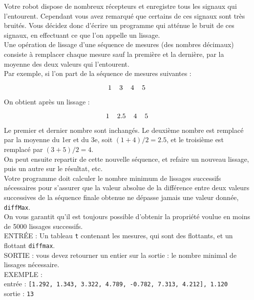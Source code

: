 Votre robot dispose de nombreux récepteurs et enregistre tous les signaux qui l'entourent. Cependant 
vous avez remarqué que certains de ces signaux sont très bruités. Vous décidez donc d'écrire un 
programme qui atténue le bruit de ces signaux, en effectuant ce que l'on appelle un lissage.\\
Une opération de lissage d'une séquence de mesures (des nombres décimaux) consiste à remplacer 
chaque mesure sauf la première et la dernière, par la moyenne des deux valeurs qui l'entourent.\\

Par exemple, si l'on part de la séquence de mesures suivantes :

$$1\hspace{.4cm} 3\hspace{.4cm} 4\hspace{.4cm} 5$$

On obtient après un lissage :

$$1\hspace{.4cm} 2.5\hspace{.4cm} 4\hspace{.4cm} 5$$

Le premier et dernier nombre sont inchangés. Le deuxième nombre est remplacé par la moyenne du 1er 
et du 3e, soit $(1+4)/2 = 2.5$, et le troisième est remplacé par $(3+5)/2 = 4$.\\

On peut ensuite repartir de cette nouvelle séquence, et refaire un nouveau lissage, puis un autre 
sur le résultat, etc.\\
Votre programme doit calculer le nombre minimum de lissages successifs nécessaires pour s'assurer 
que la valeur absolue de la différence entre deux valeurs successives de la séquence finale obtenue 
ne dépasse jamais une valeur donnée, \texttt{diffMax}.\\

On vous garantit qu'il est toujours possible d'obtenir la propriété voulue en moins de 5000 lissages 
successifs.\\

\noindent ENTRÉE : Un tableau \texttt{t} contenant les mesures, qui sont des flottants, et un 
flottant \texttt{diffmax}.\\
SORTIE : vous devez retourner un entier sur la sortie : le nombre minimal de lissages nécessaire.\\

\noindent EXEMPLE :\\
\noindent entrée : \texttt{[1.292, 1.343, 3.322, 4.789, -0.782, 7.313, 4.212], 1.120}\\
sortie : \texttt{13}
